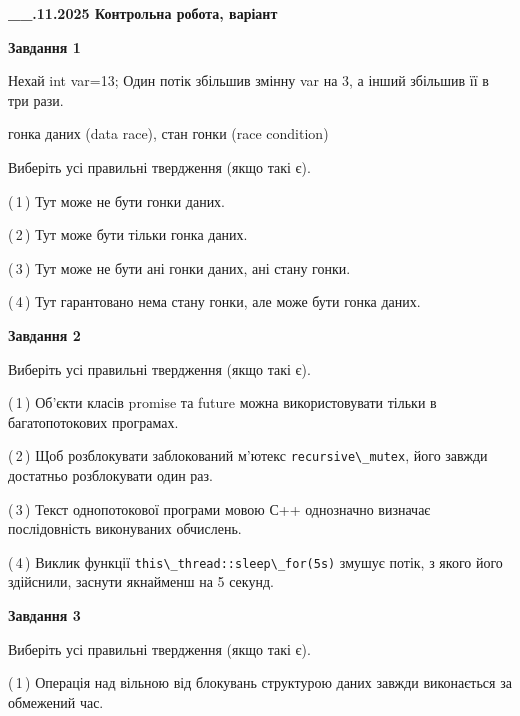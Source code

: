 \documentclass[12pt, ukrainian]{article}
\def\code#1{\Verb!#1!}
\begin{document}
\begin {large}

\textbf{\_\_.11.2025 Контрольна робота, варіант  }\par


{

\begin{center}
\textbf{Завдання 1}
\end{center}
Нехай int var=13; Один потік збільшив змінну var на 3, а інший збільшив її в три рази.

гонка даних (data race), стан гонки (race condition)

Виберіть усі правильні твердження (якщо такі є).\par
\vspace{2mm}
(\,1\,) Тут може не бути гонки даних.%

(\,2\,) Тут може бути тільки гонка даних.%

(\,3\,) Тут може не бути ані гонки даних, ані стану гонки.%

(\,4\,) Тут гарантовано нема стану гонки, але може бути гонка даних.%



\begin{center}
\textbf{Завдання 2}
\end{center}
Виберіть усі правильні твердження (якщо такі є).\par
\vspace{2mm}

(\,1\,) Об’єкти класів promise та future можна використовувати тільки в багатопотокових програмах.%

(\,2\,) Щоб розблокувати заблокований м’ютекс \code{recursive\_mutex}, його завжди достатньо розблокувати один раз.%

(\,3\,) Текст однопотокової програми мовою С++ однозначно визначає послідовність виконуваних обчислень.%

(\,4\,) Виклик функції \code{this\_thread::sleep\_for(5s)} змушує потік, з якого його здійснили, заснути якнайменш на 5 секунд.%



\begin{center}
\textbf{Завдання 3}
\end{center}
Виберіть усі правильні твердження (якщо такі є).\par
\vspace{2mm}

(\,1\,) Операція над вільною від блокувань структурою даних завжди виконається за обмежений час.%

}
\end{large}
\end{document}
